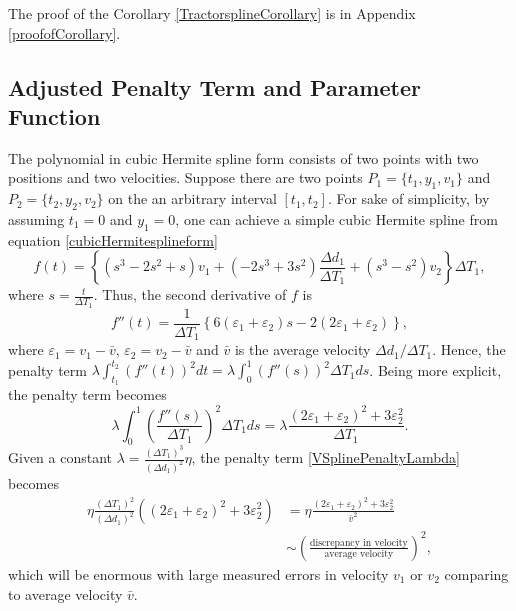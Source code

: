 The proof of the Corollary \ref{TractorsplineCorollary} is in Appendix \ref{proofofCorollary}. 


\subsection{Adjusted Penalty Term and Parameter Function}


The polynomial in cubic Hermite spline form consists of two points with two positions and two velocities. Suppose there are two points $P_1=\{t_1,y_1,v_1\}$ and $P_2=\{t_2,y_2,v_2\}$ on the an arbitrary interval $[t_1,t_2]$. For sake of simplicity, by assuming $t_1=0$ and $y_1=0$, one can achieve a simple cubic Hermite spline from equation \eqref{cubicHermitesplineform} 
\begin{equation}
f(t) =\left\{ \left(s^3-2s^2+s\right) v_1+\left(-2s^3+3s^2\right)\frac{\Delta d_1}{\Delta T_1}+\left(s^3-s^2\right)v_2 \right\}\Delta T_1, 
\end{equation}
where $s=\frac{t}{\Delta T_1}$. Thus, the second derivative of $f$ is  
\begin{equation}
f''(t)=\frac{1}{\Delta T_1}\left\{ 6\left(\varepsilon_1+\varepsilon_2\right)s-2\left(2\varepsilon_1+\varepsilon_2\right)\right\},
\end{equation}
where $\varepsilon_1=v_1-\bar{v}$, $\varepsilon_2=v_2-\bar{v}$ and $\bar{v}$ is the average velocity $\Delta d_1/\Delta T_1$. Hence, the penalty term $\lambda \int_{t_1}^{t_2}\left(f''(t)\right)^2dt = \lambda \int_0^1 \left(f''(s)\right)^2\Delta T_1 ds$. Being more explicit, the penalty term becomes 
\begin{equation}\label{VSplinePenaltyLambda}
\lambda \int_0^1\left( \frac{f''(s)}{\Delta T_1}\right)^2\Delta T_1 ds = \lambda \frac{\left(2\varepsilon_1+\varepsilon_2\right)^2+3\varepsilon_2^2}{\Delta T_1}. 
\end{equation}
Given a constant $\lambda = \frac{\left(\Delta T_1\right)^3}{\left(\Delta d_1\right)^2}\eta$, the penalty term \eqref{VSplinePenaltyLambda} becomes
\begin{equation}\label{APTintroequation}
\begin{split}
\eta \frac{\left(\Delta T_1\right)^2}{\left(\Delta d_1\right)^2} \left(\left(2\varepsilon_1+\varepsilon_2\right)^2+3\varepsilon_2^2\right) &= \eta \frac{\left(2\varepsilon_1+\varepsilon_2\right)^2+3\varepsilon_2^2}{\bar{v}^2} \\ &\sim \left(\frac{\mbox{discrepancy in velocity}}{\mbox{average velocity}}\right)^2, 
\end{split}
\end{equation}
which will be enormous with large measured errors in velocity $v_1$ or $v_2$ comparing to average velocity $\bar{v}$. 

